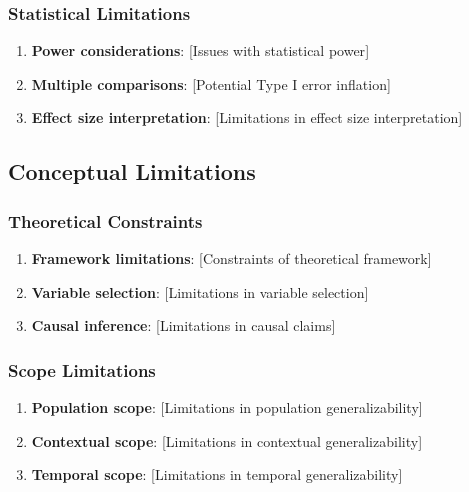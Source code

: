 \documentclass[
  12pt,
  letterpaper,
  12pt,
  letterpaper,
  oneside]{report}
\providecommand{\tightlist}{%
  \setlength{\itemsep}{0pt}\setlength{\parskip}{0pt}}
\begin{document}
\subsubsection{Statistical Limitations}\label{statistical-limitations}

\begin{enumerate}
\def\labelenumi{\arabic{enumi}.}
\tightlist
\item
  \textbf{Power considerations}: {[}Issues with statistical power{]}
\item
  \textbf{Multiple comparisons}: {[}Potential Type I error inflation{]}
\item
  \textbf{Effect size interpretation}: {[}Limitations in effect size
  interpretation{]}
\end{enumerate}

\subsection{Conceptual Limitations}\label{conceptual-limitations}

\subsubsection{Theoretical Constraints}\label{theoretical-constraints}

\begin{enumerate}
\def\labelenumi{\arabic{enumi}.}
\tightlist
\item
  \textbf{Framework limitations}: {[}Constraints of theoretical
  framework{]}
\item
  \textbf{Variable selection}: {[}Limitations in variable selection{]}
\item
  \textbf{Causal inference}: {[}Limitations in causal claims{]}
\end{enumerate}

\subsubsection{Scope Limitations}\label{scope-limitations}

\begin{enumerate}
\def\labelenumi{\arabic{enumi}.}
\tightlist
\item
  \textbf{Population scope}: {[}Limitations in population
  generalizability{]}
\item
  \textbf{Contextual scope}: {[}Limitations in contextual
  generalizability{]}
\item
  \textbf{Temporal scope}: {[}Limitations in temporal
  generalizability{]}
\end{enumerate}
\end{document}

